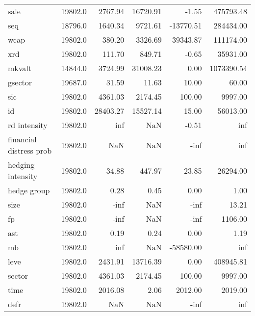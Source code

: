 \begin{tabular}{lrrrrr}
sale                    &  19802.0 &   2767.94 &  16720.91 &     -1.55 &   475793.48 \\
seq                     &  18796.0 &   1640.34 &   9721.61 & -13770.51 &   284434.00 \\
wcap                    &  19802.0 &    380.20 &   3326.69 & -39343.87 &   111174.00 \\
xrd                     &  19802.0 &    111.70 &    849.71 &     -0.65 &    35931.00 \\
mkvalt                  &  14844.0 &   3724.99 &  31008.23 &      0.00 &  1073390.54 \\
gsector                 &  19687.0 &     31.59 &     11.63 &     10.00 &       60.00 \\
sic                     &  19802.0 &   4361.03 &   2174.45 &    100.00 &     9997.00 \\
id                      &  19802.0 &  28403.27 &  15527.14 &     15.00 &    56013.00 \\
rd intensity            &  19802.0 &       inf &       NaN &     -0.51 &         inf \\
financial distress prob &  19802.0 &       NaN &       NaN &      -inf &         inf \\
hedging intensity       &  19802.0 &     34.88 &    447.97 &    -23.85 &    26294.00 \\
hedge group             &  19802.0 &      0.28 &      0.45 &      0.00 &        1.00 \\
size                    &  19802.0 &      -inf &       NaN &      -inf &       13.21 \\
fp                      &  19802.0 &      -inf &       NaN &      -inf &     1106.00 \\
ast                     &  19802.0 &      0.19 &      0.24 &      0.00 &        1.19 \\
mb                      &  19802.0 &       inf &       NaN & -58580.00 &         inf \\
leve                    &  19802.0 &   2431.91 &  13716.39 &      0.00 &   408945.81 \\
sector                  &  19802.0 &   4361.03 &   2174.45 &    100.00 &     9997.00 \\
time                    &  19802.0 &   2016.08 &      2.06 &   2012.00 &     2019.00 \\
defr                    &  19802.0 &       NaN &       NaN &      -inf &         inf \\
\bottomrule
\end{tabular}
